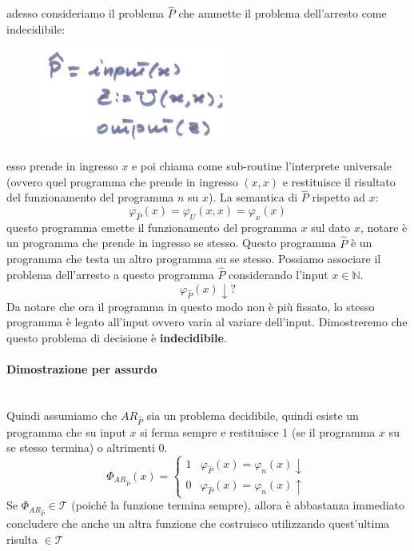 \documentclass{article}
\begin{document}
adesso consideriamo il problema $\hat{P}$ che ammette il problema dell'arresto come
indecidibile:
\begin{figure}[H]
    \centering
    \includegraphics[scale=0.5]{images/programma_P_hat.png}
\end{figure}
esso prende in ingresso $x$ e poi chiama come sub-routine l'interprete universale
(ovvero quel programma che prende in ingresso $(x,x)$ e restituisce il risultato
del funzionamento del programma $n$ su $x$). La semantica di $\hat{P}$ rispetto
ad $x$:
$$\varphi_{\hat{P}}(x)=\varphi_U(x,x)=\varphi_x(x)$$
questo programma emette il funzionamento del programma $x$ sul dato $x$, notare è un
programma che prende in ingresso se stesso. Questo programma $\hat{P}$ è un programma
che testa un altro programma su se stesso.
Possiamo associare il problema dell'arresto a questo programma $\hat{P}$ considerando
l'input $x\in\mathbb{N}$.
$$\varphi_{\hat{P}}(x)\downarrow?$$
Da notare che ora il programma in questo modo non è più fissato, lo stesso programma
è legato all'input ovvero varia al variare dell'input. Dimostreremo che
questo problema di decisione è \textbf{indecidibile}.

\paragraph{Dimostrazione per assurdo}\mbox{}\\
Quindi assumiamo che $AR_{\hat{P}}$ sia un problema decidibile, quindi esiste un programma
che su input $x$ si ferma sempre e restituisce 1 (se il programma $x$ su se stesso termina) o altrimenti 0.
\[
    \Phi_{AR_{\hat{P}}}(x)=
    \begin{cases}
        1 & \varphi_{\hat{P}}(x)=\varphi_n(x)\downarrow \\
        0 & \varphi_{\hat{P}}(x)=\varphi_n(x)\uparrow
    \end{cases}
\]
Se $\Phi_{AR_{\hat{P}}}\in\mathcal{T}$ (poiché la funzione termina sempre), allora è abbastanza
immediato concludere che anche un altra funzione che costruisco utilizzando quest'ultima
risulta $\in\mathcal{T}$
\end{document}
